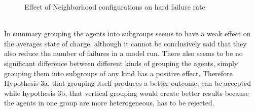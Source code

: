 \documentclass[a4paper]{article}
\begin{document}
\begin{figure}[!ht]
\caption{Effect of Neighborhood configurations on hard failure rate}
\label{group_hard_failures}
\end{figure}
\\
In summary grouping the agents into subgroups seems to have a weak effect on the averages state of charge, although it cannot be
conclusively said that they also reduce the number of failures in a  model run. There also seems to be no significant difference 
between different kinds of grouping the agents, simply grouping them into subgroups of any kind has a positive effect. 
Therefore Hypothesis 3a, that grouping itself produces a better outcome, can be accepted while hypothesis 3b, that vertical 
grouping would create better results because the agents in one group are more heterogeneous, has to be rejected.
\end{document}
